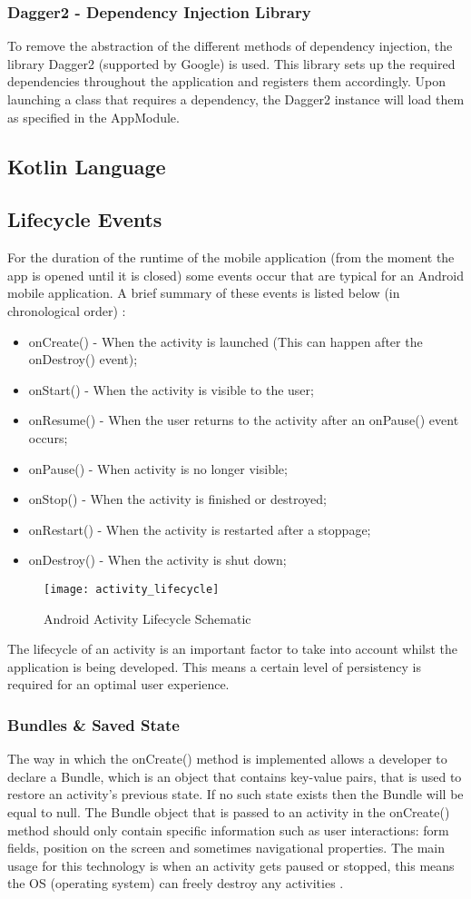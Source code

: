 \subsubsection{Dagger2 - Dependency Injection Library}
To remove the abstraction of the different methods of dependency injection, the library Dagger2 (supported by Google) is used. This library sets up the required dependencies throughout the application and registers them accordingly. Upon launching a class that requires a dependency, the Dagger2 instance will load them as specified in the AppModule.
\subsection{Kotlin Language}
\subsection{Lifecycle Events}
For the duration of the runtime of the mobile application (from the moment the app is opened until it is closed) some events occur that are typical for an Android mobile application. A brief summary of these events is listed below (in chronological order) \cite{AndroidDeveloper2019}:
\begin{itemize}
\item onCreate() - When the activity is launched (This can happen after the onDestroy() event);
\item onStart() - When the activity is visible to the user;
\item onResume() - When the user returns to the activity after an onPause() event occurs;
\item onPause() - When activity is no longer visible;
\item onStop() - When the activity is finished or destroyed;
\item onRestart() - When the activity is restarted after a stoppage;
\item onDestroy() - When the activity is shut down;
\end{itemize}
\begin{figure}[H]
\centering
\texttt{[image: activity\_lifecycle]}
\caption{Android Activity Lifecycle Schematic~\cite{AndroidDeveloper2019}}
\end{figure}
The lifecycle of an activity is an important factor to take into account whilst the application is being developed. This means a certain level of persistency is required for an optimal user experience.
\subsubsection{Bundles \& Saved State}
The way in which the onCreate() method is implemented allows a developer to declare a Bundle, which is an object that contains key-value pairs, that is used to restore an activity's previous state. If no such state exists then the Bundle will be equal to null. The Bundle object that is passed to an activity in the onCreate() method should only contain specific information such as user interactions: form fields, position on the screen and sometimes navigational properties. The main usage for this technology is when an activity gets paused or stopped, this means the OS (operating system) can freely destroy any activities \cite{JamesHalpern2012}.
